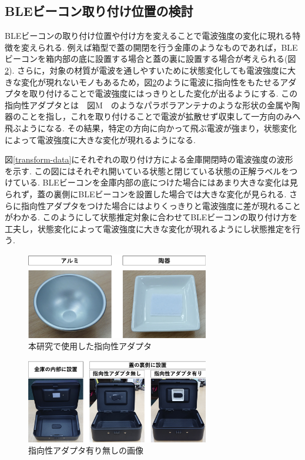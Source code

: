 \documentclass[Japanese]{dicomopapers}
\begin{document}
\subsection{BLEビーコン取り付け位置の検討}
BLEビーコンの取り付け位置や付け方を変えることで電波強度の変化に現れる特徴を変えられる.
例えば箱型で蓋の開閉を行う金庫のようなものであれば，BLEビーコンを箱内部の底に設置する場合と蓋の裏に設置する場合が考えられる(図\ref{adapter}).
さらに，対象の材質が電波を通しやすいために状態変化しても電波強度に大きな変化が現れないモノもあるため，図\ref{adapter}のように電波に指向性をもたせるアダプタを取り付けることで電波強度にはっきりとした変化が出るようにする.
この指向性アダプタとは　図M　のようなパラボラアンテナのような形状の金属や陶器のことを指し，これを取り付けることで電波が拡散せず収束して一方向のみへ飛ぶようになる.
その結果，特定の方向に向かって飛ぶ電波が強まり，状態変化によって電波強度に大きな変化が現れるようになる.

図\ref{transform-data}にそれぞれの取り付け方による金庫開閉時の電波強度の波形を示す.
この図にはそれぞれ開いている状態と閉じている状態の正解ラベルをつけている.
BLEビーコンを金庫内部の底につけた場合にはあまり大きな変化は見られず，蓋の裏側にBLEビーコンを設置した場合では大きな変化が見られる.
さらに指向性アダプタをつけた場合にはよりくっきりと電波強度に差が現れることがわかる.
このようにして状態推定対象に合わせてBLEビーコンの取り付け方を工夫し，状態変化によって電波強度に大きな変化が現れるようにし状態推定を行う.


\begin{figure}[ht]
    \centering
    \includegraphics[width=8cm]{adapta.png}
    \caption{本研究で使用した指向性アダプタ}
    \label{adapter_only}
\end{figure}

\begin{figure}[ht]
    \centering
    \includegraphics[width=8cm]{adapta_compare2.png}
    \caption{指向性アダプタ有り無しの画像}
    \label{adapter}
\end{figure}
\end{document}
